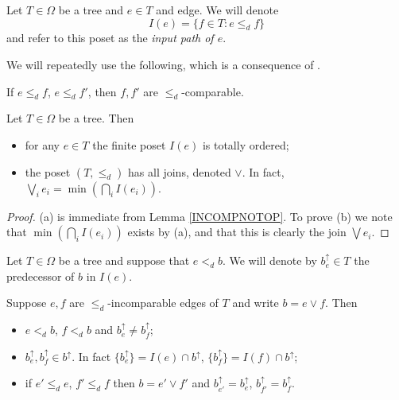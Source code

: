 \documentclass[a4paper,10pt]{article}%
\begin{document}
\begin{notation}\label{INPUTPATH NOT}
	Let $T \in \Omega$ be a tree and $e \in T$ and edge. We will denote
	\[ I(e) =\{f \in T \colon e \leq_d f \} \]
and refer to this poset as the \textit{input path of $e$}.
\end{notation}

We will repeatedly use the following, which is a consequence of \cite[Cor. 5.26]{Pe16b}.

\begin{lemma}\label{INCOMPNOTOP}
If $e \leq_d f$, $e \leq_d f'$, then $f,f'$ are $\leq_d$-comparable. 
\end{lemma} 

\begin{proposition}\label{INPUTPATHS PROP}
	Let $T \in \Omega$ be a tree. Then
	\begin{itemize}
		\item[(a)] for any $e \in T$ the finite poset $I(e)$ is totally ordered;
		\item[(b)] the poset $(T,\leq_d)$ has all joins, denoted $\vee$. In fact, $\bigvee_{i} e_i = \min (\bigcap_{i} I(e_i))$.
	\end{itemize}
\end{proposition}

\begin{proof}
	(a) is immediate from Lemma \ref{INCOMPNOTOP}.
To prove (b) we note that 
	$\min (\bigcap_{i} I(e_i))$ exists by (a), and that this is clearly the join $\bigvee{e_i}$.
\end{proof}


\begin{notation}
	Let $T \in \Omega$ be a tree and suppose that $e <_d b$. We will denote by $b^{\uparrow}_e \in T$ the predecessor of $b$ in $I(e)$.
\end{notation}


\begin{proposition}\label{INPUTPREDECESSORPROP PROP}
Suppose $e,f$ are $\leq_d$-incomparable edges of $T$ and write $b= e \vee f$. Then
\begin{itemize}
\item [(a)] $e <_d b$, $f<_d b$ and $b^{\uparrow}_e \neq b^{\uparrow}_f$;
\item [(b)] $b^{\uparrow}_e, b^{\uparrow}_f \in b^{\uparrow}$. In fact $\{b^{\uparrow}_e\} = I(e) \cap b^{\uparrow}$,
$\{b^{\uparrow}_f\} = I(f) \cap b^{\uparrow}$;
\item[(c)] if $e' \leq_d e$, $f' \leq_d f$ then 
$b = e' \vee f'$ and $b^{\uparrow}_{e'} = b^{\uparrow}_{e}$, $b^{\uparrow}_{f'} = b^{\uparrow}_{f}$.
\end{itemize}
\end{proposition}
\end{document}
